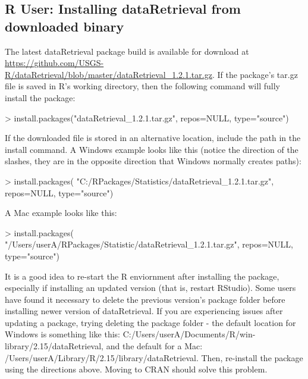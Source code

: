 \documentclass[a4paper,11pt]{article}
\begin{document}
\subsection{R User: Installing dataRetrieval from downloaded binary}
The latest dataRetrieval package build is available for download at \url{https://github.com/USGS-R/dataRetrieval/blob/master/dataRetrieval_1.2.1.tar.gz}.  If the package's tar.gz file is saved in R's working directory, then the following command will fully install the package:

\begin{Schunk}
\begin{Sinput}
> install.packages("dataRetrieval_1.2.1.tar.gz", 
                  repos=NULL, type="source")
\end{Sinput}
\end{Schunk}

If the downloaded file is stored in an alternative location, include the path in the install command.  A Windows example looks like this (notice the direction of the slashes, they are in the opposite direction that Windows normally creates paths):

\begin{Schunk}
\begin{Sinput}
> install.packages(
   "C:/RPackages/Statistics/dataRetrieval_1.2.1.tar.gz", 
   repos=NULL, type="source")
\end{Sinput}
\end{Schunk}

A Mac example looks like this:

\begin{Schunk}
\begin{Sinput}
> install.packages(
   "/Users/userA/RPackages/Statistic/dataRetrieval_1.2.1.tar.gz", 
   repos=NULL, type="source")
\end{Sinput}
\end{Schunk}

It is a good idea to re-start the R enviornment after installing the package, especially if installing an updated version (that is, restart RStudio). Some users have found it necessary to delete the previous version's package folder before installing newer version of dataRetrieval. If you are experiencing issues after updating a package, trying deleting the package folder - the default location for Windows is something like this: C:/Users/userA/Documents/R/win-library/2.15/dataRetrieval, and the default for a Mac: /Users/userA/Library/R/2.15/library/dataRetrieval. Then, re-install the package using the directions above. Moving to CRAN should solve this problem.
\end{document}
